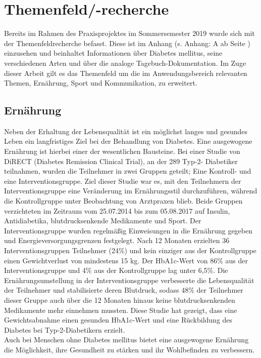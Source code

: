 \section{Themenfeld/-recherche}
	Bereits im Rahmen des Praxisprojektes im Sommersemester 2019 wurde sich mit der Themenfeldrecherche befasst. Diese ist im Anhang (s. Anhang: A  ab Seite \pageref{section:Themenfeld}) einzusehen und beinhaltet Informationen über Diabetes mellitus, seine verschiedenen Arten und über die analoge Tagebuch-Dokumentation. Im Zuge dieser Arbeit gilt es das Themenfeld um die im Anwendungsbereich relevanten Themen, Ernährung, Sport und Kommunikation, zu erweitert.
	\subsection{Ernährung}
		Neben der Erhaltung der Lebensqualität ist ein möglichst langes und gesundes Leben ein langfristiges Ziel bei der Behandlung von Diabetes. Eine ausgewogene Ernährung ist hierbei einer der wesentlichen Bausteine. \newline
		Bei einer Studie von DiRECT (Diabetes Remission Clinical Trial), an der 289 Typ-2- Diabetiker teilnahmen, wurden die Teilnehmer in zwei Gruppen geteilt; Eine Kontroll- und eine Interventionsgruppe. Ziel dieser Studie war es, mit den Teilnehmern der Interventionsgruppe eine Veränderung im Ernährungsstil durchzuführen, während die Kontrollgruppe unter Beobachtung von Arztpraxen blieb. Beide Gruppen verzichteten im Zeitraum vom 25.07.2014 bis zum 05.08.2017 auf Insulin, Antidiabetika, blutdrucksenkende Medikamente und Sport. Der Interventionsgruppe wurden regelmäßig Einweisungen in die Ernährung gegeben und Energieversorgungsgrenzen festgelegt. Nach 12 Monaten erzielten 36 Interventionsgruppen Teilnehmer (24\%) und kein einziger aus der Kontrollgruppe einen Gewichtverlust von mindestens 15 kg. Der HbA1c-Wert von 86\% aus der Interventionsgruppe und 4\% aus der Kontrollgruppe lag unter 6,5\%. Die Ernährungsumstellung in der Interventionsgruppe verbesserte die Lebensqualität der Teilnehmer und stabilisierte deren Blutdruck, sodass 48\% der Teilnehmer dieser Gruppe auch über die 12 Monaten hinaus keine blutdrucksenkenden Medikamente mehr einnehmen mussten. Diese Studie hat gezeigt, dass eine Gewichtsabnahme einen gesunden HbA1c-Wert und eine Rückbildung des Diabetes bei Typ-2-Diabetikern erzielt. \\
		Auch bei Menschen ohne Diabetes mellitus bietet eine ausgewogene Ernährung die Möglichkeit, ihre Gesundheit zu stärken und ihr Wohlbefinden zu verbessern.\newline	
